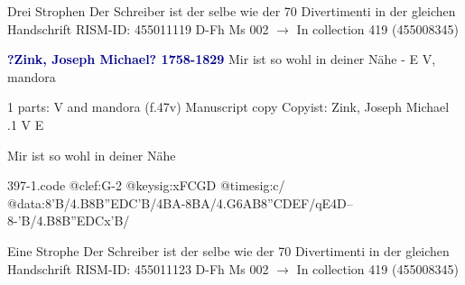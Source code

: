\documentclass[twocolumn]{book}
\begin{document}
\newline Drei Strophen
\newline Der Schreiber ist der selbe wie der 70 Divertimenti in der gleichen Handschrift
\newline RISM-ID: 455011119
\newline D-Fh  Ms 002
\newline $\rightarrow$ In collection 419 (455008345)
      
\newline \par \vspace{7pt} \textcolor{darkblue}{\textbf{?Zink, Joseph Michael?  1758-1829}}
\newline Mir ist so wohl in deiner Nähe - E
\newline V, mandora
\newline \begin{itshape}\end{itshape} 
\newline \textcolor{darkblue}{}  1 parts: V and mandora  (f.47v)
\newline Manuscript copy
\newline Copyist: Zink, Joseph Michael
.1  V  E
\newline \begin{footnotesize} Mir ist so wohl in deiner Nähe \end{footnotesize}  
\begin{filecontents*}{397-1.code}
@clef:G-2
@keysig:xFCGD
@timesig:c/
@data:8'B/4.B8B''EDC'B/4BA-{8BA}/4.G{6AB}8''CDEF/qE4D--8-'B/4.B8B''EDCx'B/
\end{filecontents*}
\newline
%

\newline Eine Strophe
\newline Der Schreiber ist der selbe wie der 70 Divertimenti in der gleichen Handschrift
\newline RISM-ID: 455011123
\newline D-Fh  Ms 002
\newline $\rightarrow$ In collection 419 (455008345)
      
\end{document}
